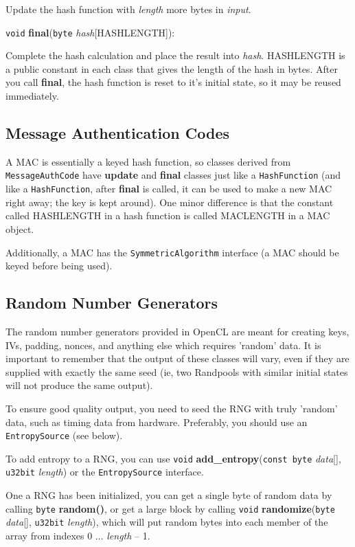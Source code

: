\documentclass{article}
\newcommand{\function}[1]{\textbf{#1}}
\newcommand{\type}[1]{\texttt{#1}}
\renewcommand{\arg}[1]{\textsl{#1}}
\begin{document}
\vskip 5pt
Update the hash function with \arg{length} more bytes in \arg{input}.

\vskip 10pt \noindent
\type{void} \function{final}(\type{byte} \arg{hash}[HASHLENGTH]):

\vskip 5pt
Complete the hash calculation and place the result into \arg{hash}. HASHLENGTH
is a public constant in each class that gives the length of the hash in bytes.
After you call \function{final}, the hash function is reset to it's initial
state, so it may be reused immediately.

\subsection{Message Authentication Codes}

A MAC is essentially a keyed hash function, so classes derived from
\type{MessageAuthCode} have \function{update} and \function{final} classes just
like a \type{HashFunction} (and like a \type{HashFunction}, after
\function{final} is called, it can be used to make a new MAC right away; the
key is kept around).  One minor difference is that the constant called
HASHLENGTH in a hash function is called MACLENGTH in a MAC object.

Additionally, a MAC has the \type{SymmetricAlgorithm} interface (a MAC should
be keyed before being used).

\subsection{Random Number Generators}

The random number generators provided in OpenCL are meant for creating keys,
IVs, padding, nonces, and anything else which requires 'random' data. It is
important to remember that the output of these classes will vary, even if they
are supplied with exactly the same seed (ie, two Randpools with similar initial
states will not produce the same output).

To ensure good quality output, you need to seed the RNG with truly 'random'
data, such as timing data from hardware. Preferably, you should use an
\type{EntropySource} (see below).

To add entropy to a RNG, you can use \type{void}
\function{add\_entropy}(\type{const byte} \arg{data}[], \type{u32bit}
\arg{length}) or the \type{EntropySource} interface.

One a RNG has been initialized, you can get a single byte of random data by
calling \type{byte} \function{random()}, or get a large block by calling
\type{void} \function{randomize}(\type{byte} \arg{data}[], \type{u32bit}
\arg{length}), which will put random bytes into each member of the array from
indexes 0 $\ldots$ \arg{length} -- 1.
\end{document}

